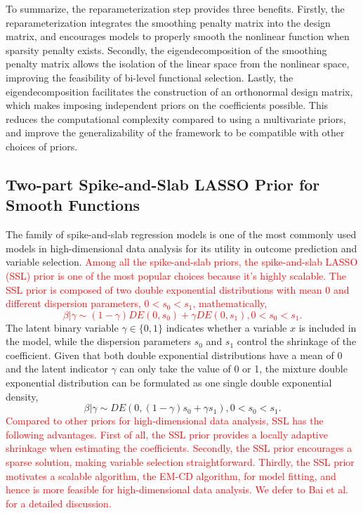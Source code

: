 \documentclass[AMA,STIX1COL,]{WileyNJD-v2}
\begin{document}
To summarize, the reparameterization step provides three benefits.
Firstly, the reparameterization integrates the smoothing penalty matrix
into the design matrix, and encourages models to properly smooth the
nonlinear function when sparsity penalty exists. Secondly, the
eigendecomposition of the smoothing penalty matrix allows the isolation
of the linear space from the nonlinear space, improving the feasibility
of bi-level functional selection. Lastly, the eigendecomposition
facilitates the construction of an orthonormal design matrix, which
makes imposing independent priors on the coefficients possible. This
reduces the computational complexity compared to using a multivariate
priors, and improve the generalizability of the framework to be
compatible with other choices of priors.

\subsection{Two-part Spike-and-Slab LASSO Prior for Smooth Functions}\label{sec:method_prior}

The family of spike-and-slab regression models is one of the most
commonly used models in high-dimensional data analysis for its utility
in outcome prediction and variable selection.
\textcolor{red}{Among all the spike-and-slab priors, the spike-and-slab LASSO (SSL) prior \cite{Rockova2018b, Rockova2018} is one of the most popular choices because it's highly scalable. The SSL prior is composed of two double exponential distributions with mean 0 and different dispersion parameters, $0 < s_0 < s_1$, mathematically,
\begin{equation} 
\beta | \gamma \sim (1-\gamma)DE(0, s_0) + \gamma DE(0, s_1), 0 < s_0 < s_1.\nonumber
\end{equation}
} The latent binary variable \(\gamma \in \{0,1\}\) indicates whether a
variable \(x\) is included in the model, while the dispersion parameters
\(s_0\) and \(s_1\) control the shrinkage of the coefficient. Given that
both double exponential distributions have a mean of 0 and the latent
indicator \(\gamma\) can only take the value of 0 or 1, the mixture
double exponential distribution can be formulated as one single double
exponential density, \begin{equation} \label{eq:ssl}
\beta | \gamma \sim DE(0, (1-\gamma)s_0 + \gamma s_1), 0 < s_0 < s_1.
\end{equation}
\textcolor{red}{Compared to other priors for high-dimensional data analysis, SSL has the following advantages. First of all, the SSL prior provides a locally adaptive shrinkage when estimating the coefficients. Secondly, the SSL prior encourages a sparse solution, making variable selection straightforward. Thirdly, the SSL prior motivates a scalable algorithm, the EM-CD algorithm, for model fitting, and hence is more feasible for high-dimensional data analysis. We defer to Bai et al. \cite{Bai2021Review} for a detailed discussion.}
\end{document}
